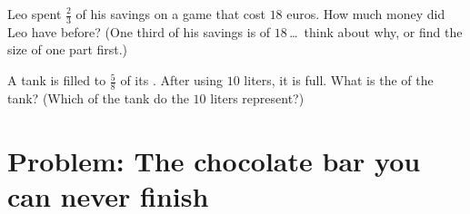 \begin{exercise}[$\star\star$]\label{exo:g6:fractions:11}
Leo spent $\frac23$ of his savings on a game that cost $18$ euros. How
much money did Leo have before? (One third of his savings is  of
$18$\,\dots\ think about why, or find the size of one part first.)
\end{exercise}

\begin{exercise}[$\star\star\star$]\label{exo:g6:fractions:12}
A tank is filled to $\frac58$ of its . After using $10$ liters,
it is  full. What is the  of the tank? (Which  of
the tank do the $10$ liters represent?)
\end{exercise}

\section{Problem: The chocolate bar you can never finish}

